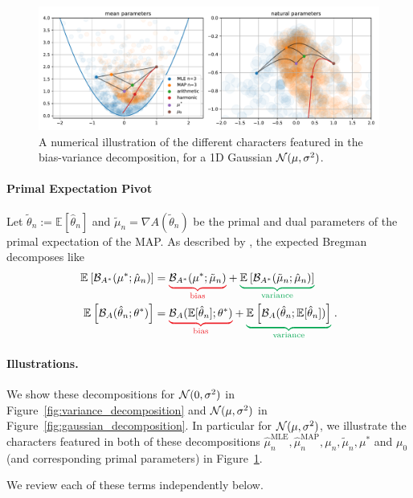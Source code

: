 \documentclass{article}
\newcommand*{\expect}[2][]{\ensuremath{\mathbb{E}_{#1} \left[ #2 \right] }} %
\newcommand{\logpart}{A}
\newcommand{\bregman}{\cB_\logpart}
\newcommand{\bregmanconj}{\cB_{\logpart^*}}
\newcommand{\natp}{\theta}
\newcommand{\MAPm}{\hat \mu_n}
\newcommand{\MAPt}{\hat \natp_n}
\begin{document}
\begin{figure}[ht]
	\centering
	\includegraphics[width=\textwidth]{figs/thales/numerical_schema_n=3.pdf}
	\caption{A numerical illustration of the different characters featured in the bias-variance decomposition, for a 1D Gaussian ${\mathcal N}(\mu, \sigma^2)$.}
	\label{fig:bias-variance-numerical}
\end{figure}


\paragraph{Primal Expectation Pivot}
Let $\tilde \theta_n := \expect{\hat \theta_n}$ and $\tilde \mu_n = \nabla \logpart(\tilde \theta_n )$ be the primal and dual parameters of the primal expectation of the MAP.
As described by \citet[Theorem 0.1]{pfau2013generalized}, the  expected Bregman decomposes like
\begin{align}
	\expect{\bregmanconj(\mu^* ; \hat \mu_n)} 
	&= \bias{\bregmanconj(\mu^* ; \tilde \mu_n)}
	+ \variance{\expect{\bregmanconj(\tilde \mu_n ; \MAPm)}} \\
	\expect{\bregman(\MAPt; \natp^*)} 
	&= \bias{\bregman(\E[\MAPt]; \natp^*)}
	+ \variance{\expect{\bregman(\MAPt; \E[\MAPt])}}  \; .
\end{align}

\paragraph{Illustrations.}
We show these decompositions for ${\mathcal N}(0,\sigma^2)$ in Figure~\ref{fig:variance_decomposition} and  ${\mathcal N}(\mu, \sigma^2)$ in Figure~\ref{fig:gaussian_decomposition}.
In particular for ${\mathcal N}(\mu, \sigma^2)$, we illustrate the characters featured in both of these decompositions $\hat \mu_n^\text{MLE},\hat \mu_n^\text{MAP},\mu_n,\tilde \mu_n, \mu^*$ and $\mu_0$ (and corresponding primal parameters)  in Figure~\ref{fig:bias-variance-numerical}.

We review each of these terms independently below.
\end{document}
